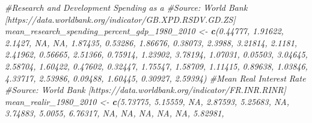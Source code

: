 \documentclass[]{article}
\newenvironment{Shaded}{\begin{snugshade}}{\end{snugshade}}
\newcommand{\CommentTok}[1]{\textcolor[rgb]{0.56,0.35,0.01}{\textit{#1}}}
\newcommand{\DecValTok}[1]{\textcolor[rgb]{0.00,0.00,0.81}{#1}}
\newcommand{\FloatTok}[1]{\textcolor[rgb]{0.00,0.00,0.81}{#1}}
\newcommand{\KeywordTok}[1]{\textcolor[rgb]{0.13,0.29,0.53}{\textbf{#1}}}
\newcommand{\NormalTok}[1]{#1}
\newcommand{\OtherTok}[1]{\textcolor[rgb]{0.56,0.35,0.01}{#1}}
\newcommand{\StringTok}[1]{\textcolor[rgb]{0.31,0.60,0.02}{#1}}
\begin{document}
\begin{Shaded}
\begin{Highlighting}[]
\CommentTok{#Research and Development Spending as a % of GDP}
\CommentTok{#Source: World Bank [https://data.worldbank.org/indicator/GB.XPD.RSDV.GD.ZS]}
\NormalTok{mean_research_spending_percent_gdp_}\DecValTok{1980}\NormalTok{_}\DecValTok{2010}\NormalTok{ <-}\StringTok{ }\KeywordTok{c}\NormalTok{(}\FloatTok{0.44777}\NormalTok{, }\FloatTok{1.91622}\NormalTok{, }\FloatTok{2.1427}\NormalTok{, }\OtherTok{NA}\NormalTok{, }\OtherTok{NA}\NormalTok{,}
                                                  \FloatTok{1.87435}\NormalTok{, }\FloatTok{0.53286}\NormalTok{, }\FloatTok{1.86676}\NormalTok{, }\FloatTok{0.38073}\NormalTok{,}
                                                  \FloatTok{2.3988}\NormalTok{, }\FloatTok{3.21814}\NormalTok{, }\FloatTok{2.1181}\NormalTok{, }\FloatTok{2.41962}\NormalTok{,}
                                                  \FloatTok{0.56665}\NormalTok{, }\FloatTok{2.51366}\NormalTok{, }\FloatTok{0.75914}\NormalTok{, }\FloatTok{1.23902}\NormalTok{,}
                                                  \FloatTok{3.78194}\NormalTok{, }\FloatTok{1.07031}\NormalTok{, }\FloatTok{0.05503}\NormalTok{, }\FloatTok{3.04645}\NormalTok{,}
                                                  \FloatTok{2.58704}\NormalTok{, }\FloatTok{1.60422}\NormalTok{, }\FloatTok{0.47602}\NormalTok{, }\FloatTok{0.32447}\NormalTok{,}
                                                  \FloatTok{1.75547}\NormalTok{, }\FloatTok{1.58709}\NormalTok{, }\FloatTok{1.11415}\NormalTok{, }\FloatTok{0.89638}\NormalTok{,}
                                                  \FloatTok{1.03846}\NormalTok{, }\FloatTok{4.33717}\NormalTok{, }\FloatTok{2.53986}\NormalTok{, }\FloatTok{0.09488}\NormalTok{,}
                                                  \FloatTok{1.60445}\NormalTok{, }\FloatTok{0.30927}\NormalTok{, }\FloatTok{2.59394}\NormalTok{)}
\CommentTok{#Mean Real Interest Rate}
\CommentTok{#Source: World Bank [https://data.worldbank.org/indicator/FR.INR.RINR]}
\NormalTok{mean_realir_}\DecValTok{1980}\NormalTok{_}\DecValTok{2010}\NormalTok{ <-}\StringTok{ }\KeywordTok{c}\NormalTok{(}\FloatTok{5.73775}\NormalTok{, }\FloatTok{5.15559}\NormalTok{, }\OtherTok{NA}\NormalTok{, }\FloatTok{2.87593}\NormalTok{, }\FloatTok{5.25683}\NormalTok{, }\OtherTok{NA}\NormalTok{, }\FloatTok{3.74883}\NormalTok{,}
                           \FloatTok{5.0055}\NormalTok{, }\FloatTok{6.76317}\NormalTok{, }\OtherTok{NA}\NormalTok{, }\OtherTok{NA}\NormalTok{, }\OtherTok{NA}\NormalTok{, }\OtherTok{NA}\NormalTok{, }\OtherTok{NA}\NormalTok{, }\FloatTok{5.82981}\NormalTok{,}
}
\end{Highlighting}
\end{Shaded}
\end{document}
